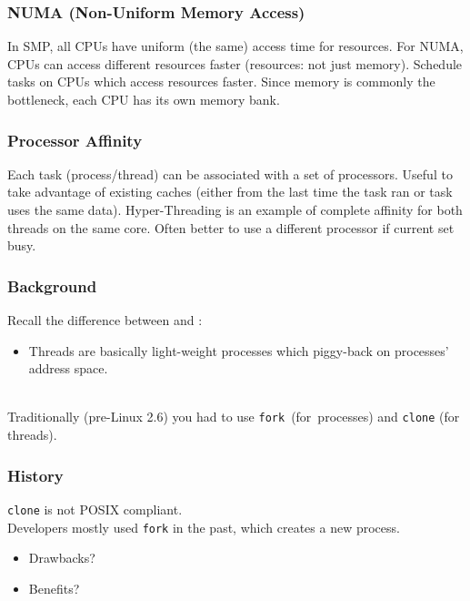 \begin{frame}
  \frametitle{NUMA (Non-Uniform Memory Access)}


    In SMP, all CPUs have uniform (the same) access time for resources.
    \vfill
    For NUMA, CPUs can access different resources faster (resources: not just
          memory).
    \vfill
    Schedule tasks on CPUs which access resources faster.
    \vfill
    Since memory is commonly the bottleneck, each CPU has its own memory
          bank.

\end{frame}

\begin{frame}
  \frametitle{Processor Affinity}


    Each task (process/thread) can be associated with a set of processors.
    \vfill
    Useful to take advantage of existing caches (either from the last time
          the task ran or task uses the same data).
    \vfill
    Hyper-Threading is an example of complete affinity for both threads on
          the same core.
    \vfill
    Often better to use a different processor if current set busy.

\end{frame}

\begin{frame}[fragile]
  \frametitle{Background}


  Recall the difference between  and 
          :
  \begin{itemize}
    \item Threads are basically light-weight processes which piggy-back on
          processes' address space.
  \end{itemize} ~\\
  Traditionally (pre-Linux 2.6) you had to use {\tt fork}~(for~processes) and {\tt clone} (for threads).


\end{frame}

\begin{frame}[fragile]
  \frametitle{History}


    {\tt clone} is not POSIX compliant.
    ~\\
    Developers mostly used {\tt fork} in the past, which creates a new process.
      \begin{itemize}
        \item Drawbacks?
        \item Benefits?
      \end{itemize}

\end{frame}

